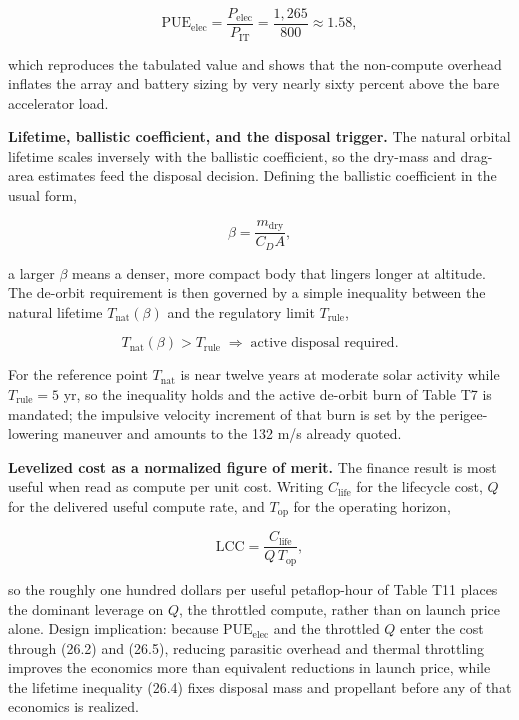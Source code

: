 \documentclass[
  11pt,
  openany,
  oneside]{book}
\begin{document}
\begin{equation}
\mathrm{PUE}_{\text{elec}} = \frac{P_{\text{elec}}}{P_{\text{IT}}} = \frac{1{,}265}{800} \approx 1.58, \tag{26.2}
\end{equation}

which reproduces the tabulated value and shows that the non-compute
overhead inflates the array and battery sizing by very nearly sixty
percent above the bare accelerator load.

\textbf{Lifetime, ballistic coefficient, and the disposal trigger.} The
natural orbital lifetime scales inversely with the ballistic
coefficient, so the dry-mass and drag-area estimates feed the disposal
decision. Defining the ballistic coefficient in the usual form,

\begin{equation}
\beta = \frac{m_{\text{dry}}}{C_D A}, \tag{26.3}
\end{equation}

a larger \(\beta\) means a denser, more compact body that lingers longer
at altitude. The de-orbit requirement is then governed by a simple
inequality between the natural lifetime \(T_{\text{nat}}(\beta)\) and
the regulatory limit \(T_{\text{rule}}\),

\begin{equation}
T_{\text{nat}}(\beta) > T_{\text{rule}} \;\Longrightarrow\; \text{active disposal required}. \tag{26.4}
\end{equation}

For the reference point \(T_{\text{nat}}\) is near twelve years at
moderate solar activity while \(T_{\text{rule}} = 5\) yr, so the
inequality holds and the active de-orbit burn of Table T7 is mandated;
the impulsive velocity increment of that burn is set by the
perigee-lowering maneuver and amounts to the 132 m/s already quoted.

\textbf{Levelized cost as a normalized figure of merit.} The finance
result is most useful when read as compute per unit cost. Writing
\(C_{\text{life}}\) for the lifecycle cost, \(Q\) for the delivered
useful compute rate, and \(T_{\text{op}}\) for the operating horizon,

\begin{equation}
\mathrm{LCC} = \frac{C_{\text{life}}}{Q \, T_{\text{op}}}, \tag{26.5}
\end{equation}

so the roughly one hundred dollars per useful petaflop-hour of Table T11
places the dominant leverage on \(Q\), the throttled compute, rather
than on launch price alone. Design implication: because
\(\mathrm{PUE}_{\text{elec}}\) and the throttled \(Q\) enter the cost
through (26.2) and (26.5), reducing parasitic overhead and thermal
throttling improves the economics more than equivalent reductions in
launch price, while the lifetime inequality (26.4) fixes disposal mass
and propellant before any of that economics is realized.
\end{document}

